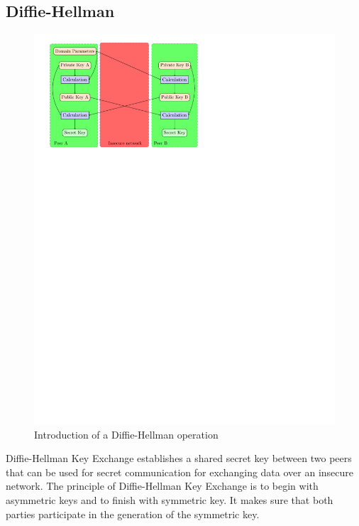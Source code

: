\subsection{Diffie-Hellman}
\label{intro_dh}
\begin{figure}[!ht]
\centering
\includegraphics[trim=0cm 20cm 8cm 0cm]{figures/diffie_hellman.pdf}
\caption{Introduction of a Diffie-Hellman operation}
\label{fig:dh}
\end{figure}
Diffie-Hellman Key Exchange establishes a shared secret key between two peers
that can be used for secret communication for exchanging data over an insecure
network.\newline
The principle of Diffie-Hellman Key Exchange is to begin with asymmetric keys and
to finish with symmetric key. \newline
It makes sure that both parties
participate in the generation of the symmetric key.\newline

